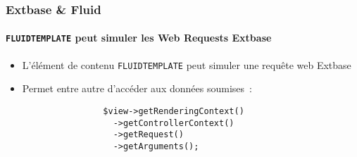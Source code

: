 \begin{frame}[fragile]
	\frametitle{Extbase \& Fluid}
	\framesubtitle{\texttt{FLUIDTEMPLATE} peut simuler les Web Requests Extbase}

	\lstset{basicstyle=\small\ttfamily}

	\begin{itemize}
		\item L'élément de contenu \texttt{FLUIDTEMPLATE} peut simuler une requête web Extbase
		\item Permet entre autre d'accéder aux données soumises~:

			\begin{lstlisting}
				$view->getRenderingContext()
				  ->getControllerContext()
				  ->getRequest()
				  ->getArguments();
			\end{lstlisting}

	\end{itemize}

\end{frame}




